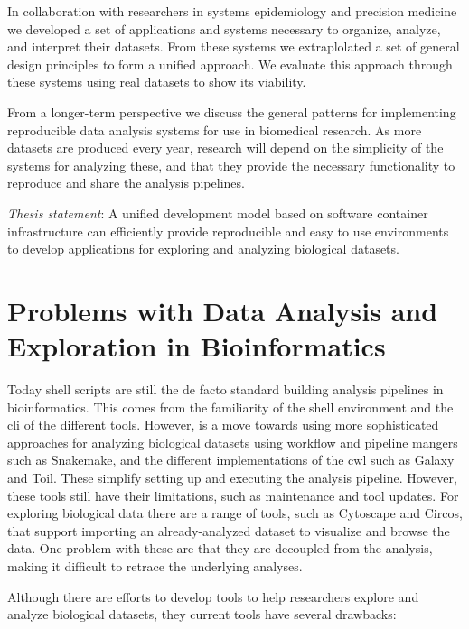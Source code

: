 In collaboration with researchers in systems epidemiology and precision
medicine we developed a set of applications and systems necessary to organize,
analyze, and interpret their datasets. From these systems we extraplolated a set
of general design principles to form a unified approach. We evaluate this
approach through these systems using real datasets to show its viability. 

From a longer-term perspective we discuss the general patterns for implementing
reproducible data analysis systems for use in biomedical research. As more
datasets are produced every year, research will depend on the simplicity of the
systems for analyzing these, and that they provide the necessary functionality
to reproduce and share the analysis pipelines. 

\emph{Thesis statement}:
A unified development model based on software container infrastructure can
efficiently provide reproducible and easy to use environments to develop
applications for exploring and analyzing biological datasets. 

\section{Problems with Data Analysis and Exploration in Bioinformatics}
Today shell scripts are still
the de facto standard building analysis pipelines in bioinformatics. This comes
from the familiarity of the shell environment and the \gls{cli} of the different
tools.  However, is a move towards using more sophisticated approaches for
analyzing biological datasets using workflow and pipeline mangers such as
Snakemake\cite{koster2012snakemake}, and the different implementations of the
\gls{cwl}\cite{cwl} such as Galaxy\cite{galaxy} and Toil\cite{toil}. These
simplify setting up and executing the analysis pipeline. However, these
tools still have their limitations, such as maintenance and tool updates.  For
exploring biological data there are a range of tools, such as
Cytoscape\cite{cytoscape} and Circos\cite{circos}, that support importing an
already-analyzed dataset to visualize and browse the data. One problem with
these are that they are decoupled from the analysis, making it difficult to
retrace the underlying analyses. 

Although there are efforts to develop tools to help researchers explore and
analyze biological datasets, they current tools have several drawbacks:

